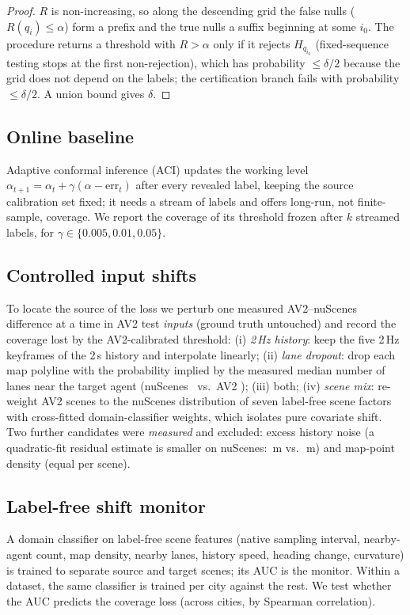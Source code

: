 \begin{proof}
$R$ is non-increasing, so along the descending grid the false nulls ($R(q_i)\le\alpha$) form a prefix and the true nulls a suffix beginning at some $i_0$.
The procedure returns a threshold with $R>\alpha$ only if it rejects $H_{q_{i_0}}$ (fixed-sequence testing stops at the first non-rejection), which has probability $\le\delta/2$
because the grid does not depend on the labels; the certification branch fails with probability $\le\delta/2$. A union bound gives $\delta$.
\end{proof}

\subsection{Online baseline}
Adaptive conformal inference (ACI) \cite{gibbs2021adaptive} updates the working level $\alpha_{t+1}=\alpha_t+\gamma(\alpha-\mathrm{err}_t)$ after every revealed label, keeping the source
calibration set fixed; it needs a stream of labels and offers long-run, not finite-sample, coverage. We report the coverage of its threshold frozen after $k$ streamed labels, for $\gamma\in\{0.005,0.01,0.05\}$.

\subsection{Controlled input shifts}\label{sec:inject}
To locate the source of the loss we perturb one measured AV2--nuScenes difference at a time in AV2 test \emph{inputs} (ground truth untouched) and record the coverage lost by
the AV2-calibrated threshold: (i) \emph{2\,Hz history}: keep the five 2\,Hz keyframes of the 2\,s history and interpolate linearly; (ii) \emph{lane dropout}: drop each map polyline with the probability implied
by the measured median number of lanes near the target agent (nuScenes \lanesMedianNs\ vs.\ AV2 \lanesMedianAv); (iii) both; (iv) \emph{scene mix}: re-weight AV2 scenes to the nuScenes distribution of seven label-free scene
factors with cross-fitted domain-classifier weights, which isolates pure covariate shift. Two further candidates were \emph{measured} and excluded: excess history noise
(a quadratic-fit residual estimate is smaller on nuScenes: \noiseSigmaNs\,m vs.\ \noiseSigmaAv\,m) and map-point density (equal per scene).

\subsection{Label-free shift monitor}
A domain classifier on label-free scene features (native sampling interval, nearby-agent count, map density, nearby
lanes, history speed, heading change, curvature) is trained to separate source and target scenes; its AUC is the monitor.
Within a dataset, the same classifier is trained per city against the rest. We test whether the AUC predicts the coverage loss
(across cities, by Spearman correlation).
